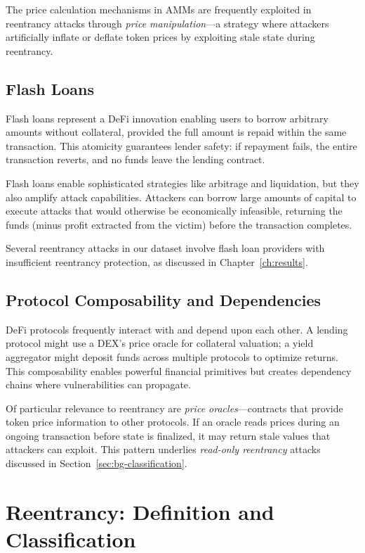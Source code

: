 The price calculation mechanisms in AMMs are frequently exploited in reentrancy attacks through \textit{price manipulation}---a strategy where attackers artificially inflate or deflate token prices by exploiting stale state during reentrancy.

\subsection{Flash Loans}

Flash loans represent a DeFi innovation enabling users to borrow arbitrary amounts without collateral, provided the full amount is repaid within the same transaction. This atomicity guarantees lender safety: if repayment fails, the entire transaction reverts, and no funds leave the lending contract.

Flash loans enable sophisticated strategies like arbitrage and liquidation, but they also amplify attack capabilities. Attackers can borrow large amounts of capital to execute attacks that would otherwise be economically infeasible, returning the funds (minus profit extracted from the victim) before the transaction completes.

Several reentrancy attacks in our dataset involve flash loan providers with insufficient reentrancy protection, as discussed in Chapter~\ref{ch:results}.

\subsection{Protocol Composability and Dependencies}

DeFi protocols frequently interact with and depend upon each other. A lending protocol might use a DEX's price oracle for collateral valuation; a yield aggregator might deposit funds across multiple protocols to optimize returns. This composability enables powerful financial primitives but creates dependency chains where vulnerabilities can propagate.

Of particular relevance to reentrancy are \textit{price oracles}---contracts that provide token price information to other protocols. If an oracle reads prices during an ongoing transaction before state is finalized, it may return stale values that attackers can exploit. This pattern underlies \textit{read-only reentrancy} attacks discussed in Section~\ref{sec:bg-classification}.

\section{Reentrancy: Definition and Classification}
\label{sec:bg-reentrancy}


